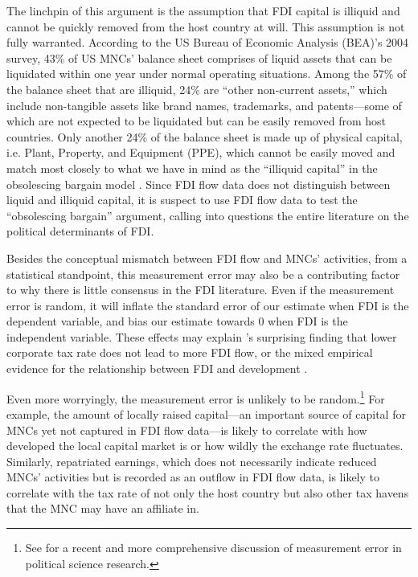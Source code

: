 The linchpin of this argument is the assumption that FDI capital is illiquid and
cannot be quickly removed from the host country at will. This assumption is not
fully warranted. According to the US Bureau of Economic Analysis (BEA)'s 2004
survey, 43\% of US MNCs' balance sheet comprises of liquid assets that can be
liquidated within one year under normal operating situations. Among the 57\% of
the balance sheet that are illiquid, 24\% are ``other non-current assets,''
which include non-tangible assets like brand names, trademarks, and
patents---some of which are not expected to be liquidated but can be easily
removed from host countries. Only another 24\% of the balance sheet is made up
of physical capital, i.e. Plant, Property, and Equipment (PPE), which cannot be
easily moved and match most closely to what we have in mind as the ``illiquid
capital'' in the obsolescing bargain model \citep[113]{Kerner2014a}. Since FDI
flow data does not distinguish between liquid and illiquid capital, it is
suspect to use FDI flow data to test the ``obsolescing bargain'' argument,
calling into questions the entire literature on the political determinants of
FDI.

Besides the conceptual mismatch between FDI flow and MNCs' activities, from a
statistical standpoint, this measurement error may also be a contributing factor
to why there is little consensus in the FDI literature. Even if the measurement
error is random, it will inflate the standard error of our estimate when FDI is
the dependent variable, and bias our estimate towards 0 when FDI is the
independent variable. These effects may explain \citet{Jensen2012}'s surprising
finding that lower corporate tax rate does not lead to more FDI flow, or the
mixed empirical evidence for the relationship between FDI and development
\citep[108]{Mold2004}.

Even more worryingly, the measurement error is unlikely to be
random.\footnote{See \citet{Gallop2017} for a recent and more comprehensive
  discussion of measurement error in political science research.} For example,
the amount of locally raised capital---an important source of capital for MNCs
yet not captured in FDI flow data---is likely to correlate with how developed
the local capital market is or how wildly the exchange rate fluctuates.
Similarly, repatriated earnings, which does not necessarily indicate reduced
MNCs' activities but is recorded as an outflow in FDI flow data, is likely to
correlate with the tax rate of not only the host country but also other tax
havens that the MNC may have an affiliate in.

